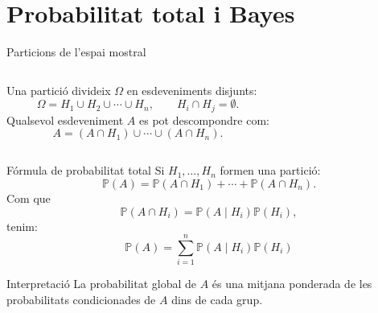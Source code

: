\documentclass[10pt,aspectratio=169]{beamer}
\newcommand{\Prob}{\mathbb{P}}
\begin{document}
\section{Probabilitat total i Bayes}

\begin{frame}{Particions de l'espai mostral}
\begin{columns}[T]
Una partició divideix $\Omega$ en esdeveniments disjunts:
\[
\Omega=H_1\cup H_2\cup\cdots\cup H_n,
\qquad H_i\cap H_j=\emptyset.
\]
Qualsevol esdeveniment $A$ es pot descompondre com:
\[
A=(A\cap H_1)\cup\cdots\cup(A\cap H_n).
\]
\begin{center}
\end{center}
\end{columns}
\end{frame}

\begin{frame}{Fórmula de probabilitat total}
Si $H_1,\ldots,H_n$ formen una partició:
\[
\Prob(A)=\Prob(A\cap H_1)+\cdots+\Prob(A\cap H_n).
\]
Com que
\[
\Prob(A\cap H_i)=\Prob(A\mid H_i)\Prob(H_i),
\]
tenim:
\[
\boxed{\Prob(A)=\sum_{i=1}^n \Prob(A\mid H_i)\Prob(H_i)}
\]
\vspace{0.1cm}
\begin{block}{Interpretació}
La probabilitat global de $A$ és una mitjana ponderada de les probabilitats condicionades de $A$ dins de cada grup.
\end{block}
\end{frame}
\end{document}
